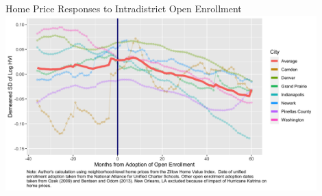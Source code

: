 \documentclass[notes,11pt, aspectratio=169]{beamer}
\newenvironment{wideitemize}{\itemize\addtolength{\itemsep}{10pt}}{\enditemize}
\begin{document}
\begin{frame}{Home Price Responses to Intradistrict Open Enrollment}
\label{giniback}
\centering
\includegraphics[width=0.9\textwidth]{figures/demeaned_hpi_sd_MONTHLY.png}
\hyperlink{gini}{}
\end{frame}

\end{document}

